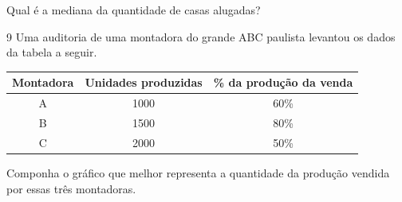 Qual é a mediana da quantidade de casas alugadas?


\num{9} Uma auditoria de uma montadora do grande ABC paulista levantou os dados 
da tabela a seguir.

\begin{center}
\begin{tabular}{c|c|c}
\hline
\multicolumn{1}{|c|}{\textbf{Montadora}} & \textbf{Unidades produzidas} & \multicolumn{1}{c|}{\textbf{\% da produção da venda}} \\ \hline
A & 1000 & 60\% \\ \hline
B & 1500 & 80\% \\ \hline
C & 2000 & 50\% \\ \hline
\end{tabular}
\end{center}

Componha o gráfico que melhor representa a quantidade da produção vendida por
essas três montadoras.


